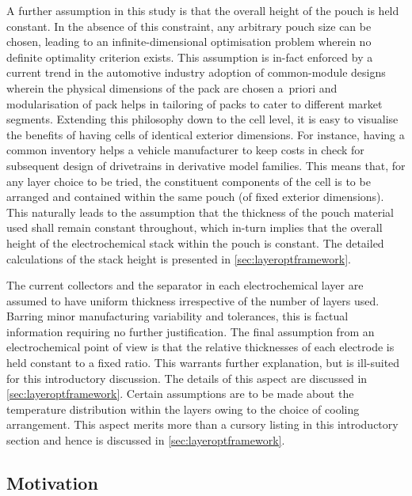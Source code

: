 A further assumption  in this study is  that the overall height of  the pouch is
held constant. In  the absence of this constraint, any  arbitrary pouch size can
be chosen,  leading to an  infinite-dimensional optimisation problem  wherein no
definite optimality criterion  exists. This assumption is in-fact  enforced by a
current  trend  in the  automotive  industry  \viz{} adoption  of  common-module
designs wherein  the physical  dimensions of  the pack  are chosen  a~priori and
modularisation of pack helps in tailoring  of packs to cater to different market
segments.  Extending this  philosophy down  to  the cell  level, it  is easy  to
visualise the  benefits of  having cells of  identical exterior  dimensions. For
instance, having a  common inventory helps a vehicle manufacturer  to keep costs
in  check  for  subsequent  design  of drivetrains  \eg{}  in  derivative  model
families. This  means that, for  any layer choice  to be tried,  the constituent
components of the cell is to be arranged and contained within the same pouch (of
fixed  exterior dimensions).  This naturally  leads to  the assumption  that the
thickness of  the pouch  material used shall  remain constant  throughout, which
in-turn implies that the overall height  of the electrochemical stack within the
pouch is constant. The detailed calculations of the stack height is presented in
\cref{sec:layeroptframework}.

The  current collectors  and the  separator  in each  electrochemical layer  are
assumed  to  have  uniform  thickness  irrespective  of  the  number  of  layers
used. Barring  minor manufacturing variability  and tolerances, this  is factual
information requiring  no further  justification. The  final assumption  from an
electrochemical point of view is that the relative thicknesses of each electrode
is held  constant to a  fixed ratio. This  warrants further explanation,  but is
ill-suited  for this  introductory discussion.  The details  of this  aspect are
discussed in  \cref{sec:layeroptframework}. Certain  assumptions are to  be made
about the  temperature distribution  within the  layers owing  to the  choice of
cooling arrangement.  This aspect  merits more  than a  cursory listing  in this
introductory section and hence is discussed in \cref{sec:layeroptframework}.

\subsection{Motivation}\label{subsec:layeroptmotivation}

